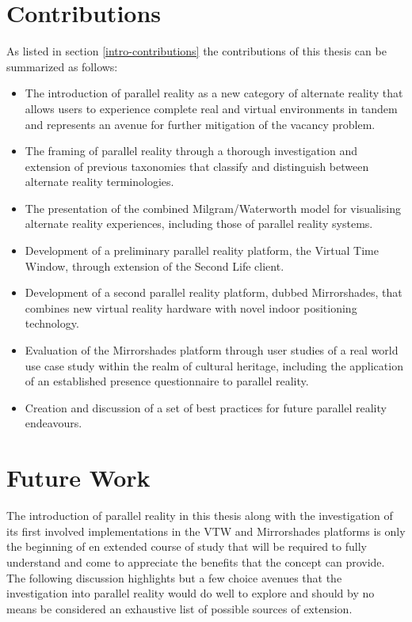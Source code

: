 
\section{Contributions}

As listed in section \ref{intro-contributions} the contributions of this thesis can be summarized as follows:

\begin{itemize}
	\item The introduction of parallel reality as a new category of alternate reality that allows users to experience complete real and virtual environments in tandem and represents an avenue for further mitigation of the vacancy problem.
	\item The framing of parallel reality through a thorough investigation and extension of previous taxonomies that classify and distinguish between alternate reality terminologies.
	\item The presentation of the combined Milgram/Waterworth model for visualising alternate reality experiences, including those of parallel reality systems.
	\item Development of a preliminary parallel reality platform, the Virtual Time Window, through extension of the Second Life client.
	\item Development of a second parallel reality platform, dubbed Mirrorshades, that combines new virtual reality hardware with novel indoor positioning technology.
	\item Evaluation of the Mirrorshades platform through user studies of a real world use case study within the realm of cultural heritage, including the application of an established presence questionnaire to parallel reality.
	\item Creation and discussion of a set of best practices for future parallel reality endeavours.
\end{itemize}


\section{Future Work}

The introduction of parallel reality in this thesis along with the investigation of its first involved implementations in the VTW and Mirrorshades platforms is only the beginning of en extended course of study that will be required to fully understand and come to appreciate the benefits that the concept can provide. The following discussion highlights but a few choice avenues that the investigation into parallel reality would do well to explore and should by no means be considered an exhaustive list of possible sources of extension.

